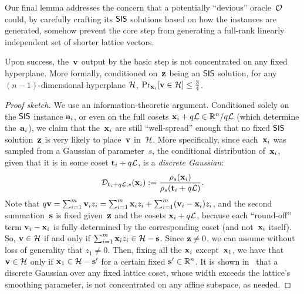 \documentclass[11pt]{article}
\begin{document}
Our final lemma addresses the concern that a potentially ``devious''
oracle~$\mathcal{O}$ could, by carefully crafting its $\mathsf{SIS}$ solutions based
on how the instances are generated, somehow prevent the core step from
generating a full-rank linearly independent set of shorter lattice
vectors.

\begin{lemma}
  \label{lem:basis-guarantee}
  Upon success, the~$\mathbf{v}$ output by the basic step is not
  concentrated on any fixed hyperplane. More formally, conditioned
  on~$\mathbf{z}$ being an $\mathsf{SIS}$ solution, for any $(n-1)$-dimensional
  hyperplane $\mathcal{H}$,
  $\Pr_{\mathbf{x}_{i}}[\mathbf{v} \in \mathcal{H}] \leq \frac{3}{4}$.
\end{lemma}

\begin{proof}[Proof sketch]
  We use an information-theoretic argument. Conditioned solely on the
  $\mathsf{SIS}$ instance $\mathbf{a}_{i}$, or even on the full cosets
  $\mathbf{x}_{i} + q\mathcal{L} \in \mathbb{R}^{n}/q\mathcal{L}$ (which determine
  the~$\mathbf{a}_{i}$), we claim that the~$\mathbf{x}_{i}$ are still
  ``well-spread'' enough that no fixed $\mathsf{SIS}$ solution~$\mathbf{z}$ is very
  likely to place~$\mathbf{v}$ in~$\mathcal{H}$. More specifically, since
  each~$\mathbf{x}_{i}$ was sampled from a Gaussian of parameter~$s$, the
  conditional distribution of~$\mathbf{x}_{i}$, given that it is in some
  coset $\mathbf{t}_{i} + q\mathcal{L}$, is a \emph{discrete Gaussian}:
  \[ \mathcal{D}_{\mathbf{t}_{i} + q\mathcal{L}, s}(\mathbf{x}_{i}) :=
    \frac{\rho_{s}(\mathbf{x}_{i})}{\rho_{s}(\mathbf{t}_{i} + q\mathcal{L})}. \]
  Note that
  $q \mathbf{v} = \sum_{i=1}^{m} \mathbf{v}_{i} z_{i} = \sum_{i=1}^{m}
  \mathbf{x}_{i}z_{i} + \sum_{i=1}^{m} (\mathbf{v}_{i} - \mathbf{x}_{i}) z_{i}$, and
  the second summation~$\mathbf{s}$ is fixed given~$\mathbf{z}$ and the cosets
  $\mathbf{x}_{i} + q\mathcal{L}$, because each ``round-off'' term
  $\mathbf{v}_{i} - \mathbf{x}_{i}$ is fully determined by the corresponding
  coset (and not~$\mathbf{x}_{i}$ itself). So, $\mathbf{v} \in \mathcal{H}$ if and
  only if $\sum_{i=1}^{m}\mathbf{x}_{i}z_{i} \in \mathcal{H} - \mathbf{s}$. Since
  $\mathbf{z} \neq 0$, we can assume without loss of generality that
  $z_{1} \neq 0$. Then, fixing all the $\mathbf{x}_{i}$ except~$\mathbf{x}_{1}$,
  we have that $\mathbf{v} \in \mathcal{H}$ only if
  $\mathbf{x}_{1} \in \mathcal{H} - \mathbf{s}'$ for a certain fixed
  $\mathbf{s}' \in \mathbb{R}^{n}$. It is shown
  in~\cite{DBLP:journals/siamcomp/MicciancioR07} that a discrete
  Gaussian over any fixed lattice coset, whose width exceeds the
  lattice's smoothing parameter, is not concentrated on any affine
  subspace, as needed.
\end{proof}



\end{document}

